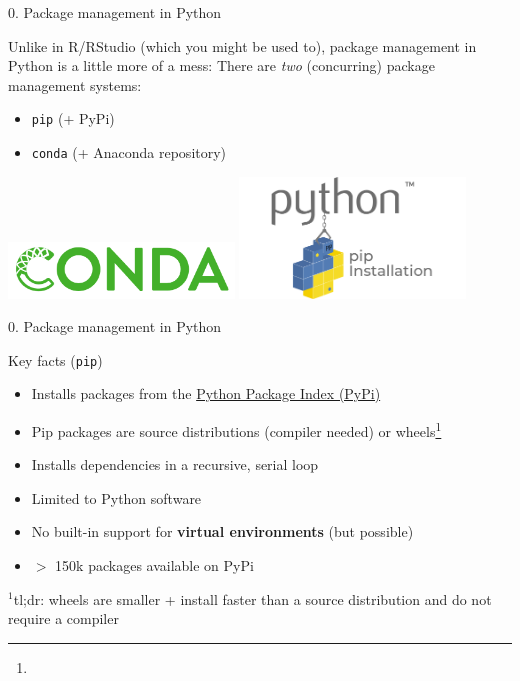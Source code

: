 \begin{vbframe}{0. Package management in Python}

\vfill

Unlike in R/RStudio (which you might be used to), package management in Python is a little more of a mess:  
There are \textit{two} (concurring) package management systems:

\begin{itemize}
		\item \texttt{pip} (+ PyPi)
		\item \texttt{conda} (+ Anaconda repository)
\end{itemize}

\centering
\includegraphics[width=0.45\textwidth]{figure/conda.png}
\includegraphics[width=0.45\textwidth]{figure/pip.png}  

\vfill

\end{vbframe}


\begin{vbframe}{0. Package management in Python}
\vfill

Key facts (\texttt{pip})
			
\begin{itemize}
		\item Installs packages from the \href{https://pypi.org/}{Python Package Index (PyPi)}
		\item Pip packages are source distributions (compiler needed) or wheels\footnote{}
		\item Installs dependencies in a recursive, serial loop
		\item Limited to Python software
		\item No built-in support for \textbf{virtual environments} (but possible)
		\item $>$ 150k packages available on PyPi
\end{itemize}

\vfill

\footnotesize $^1$tl;dr: wheels are smaller + install faster than a source distribution and do not require a compiler

\end{vbframe}

